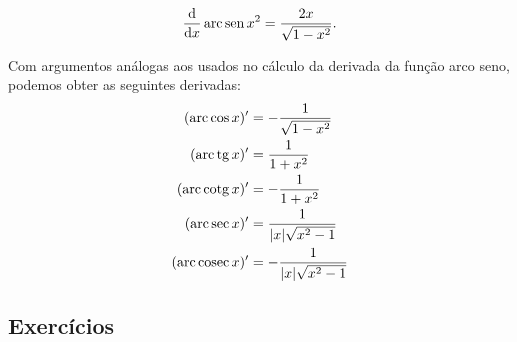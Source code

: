 \begin{ex}
  \begin{equation}
    \frac{\mathrm{d}}{\mathrm{d} x}\operatorname{arc}\operatorname{sen} x^2 = \frac{2x}{\sqrt{1-x^2}}.
  \end{equation}
\end{ex}

Com argumentos análogas aos usados no cálculo da derivada da função arco seno, podemos obter as seguintes derivadas:
\begin{align}
  (\operatorname{arc}\cos x)' &= -\frac{1}{\sqrt{1-x^2}}\\
  (\operatorname{arc}\operatorname{tg} x)' &= \frac{1}{1+x^2}\\
  (\operatorname{arc}\operatorname{cotg} x)' &= -\frac{1}{1+x^2}\\
  (\operatorname{arc}\sec x)' &= \frac{1}{|x|\sqrt{x^2-1}}\\
  (\operatorname{arc}\operatorname{cosec} x)' &= -\frac{1}{|x|\sqrt{x^2-1}}
\end{align}

\subsection*{Exercícios}

\emconstrucao

